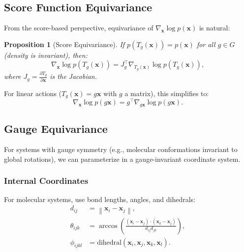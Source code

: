 \documentclass[12pt]{report}
\newtheorem{proposition}[theorem]{Proposition}
\theoremstyle{definition}
\newcommand{\norm}[1]{\left\| #1 \right\|}
\begin{document}
\subsection{Score Function Equivariance}

From the score-based perspective, equivariance of $\nabla_{\mathbf{x}} \log p(\mathbf{x})$ is natural:

\begin{proposition}[Score Equivariance]
If $p(T_g(\mathbf{x})) = p(\mathbf{x})$ for all $g \in G$ (density is invariant), then:
\begin{equation}
\nabla_{\mathbf{x}} \log p(T_g(\mathbf{x})) = J_g^\top \nabla_{T_g(\mathbf{x})} \log p(T_g(\mathbf{x})),
\label{eq:score_equivariance}
\end{equation}
where $J_g = \frac{\partial T_g}{\partial \mathbf{x}}$ is the Jacobian.
\end{proposition}

For linear actions ($T_g(\mathbf{x}) = g\mathbf{x}$ with $g$ a matrix), this simplifies to:
\begin{equation}
\nabla_{\mathbf{x}} \log p(g\mathbf{x}) = g^\top \nabla_{g\mathbf{x}} \log p(g\mathbf{x}).
\label{eq:score_linear_equivariance}
\end{equation}

\subsection{Gauge Equivariance}

For systems with gauge symmetry (e.g., molecular conformations invariant to global rotations), we can parameterize in a gauge-invariant coordinate system.

\subsubsection{Internal Coordinates}

For molecular systems, use bond lengths, angles, and dihedrals:
\begin{align}
d_{ij} &= \norm{\mathbf{x}_i - \mathbf{x}_j}, \label{eq:bond_length} \\
\theta_{ijk} &= \arccos\left(\frac{(\mathbf{x}_i - \mathbf{x}_j) \cdot (\mathbf{x}_k - \mathbf{x}_j)}{d_{ij} d_{jk}}\right), \label{eq:bond_angle} \\
\phi_{ijkl} &= \text{dihedral}(\mathbf{x}_i, \mathbf{x}_j, \mathbf{x}_k, \mathbf{x}_l). \label{eq:dihedral}
\end{align}
\end{document}
